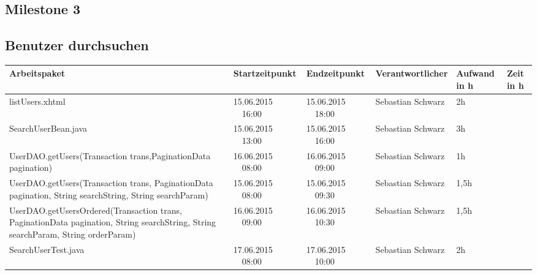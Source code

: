 \begin{landscape}
	\section{Milestone 3}	
	
	\subsection{Benutzer durchsuchen}
	\begin{tabular}{|p{10.3cm}|p{3.2cm}|p{3.2cm}|p{3.5cm}|p{1.7cm}|p{1.5cm}|}
		\hline  \textbf{Arbeitspaket} & \textbf{Startzeitpunkt} & \textbf{Endzeitpunkt} & \textbf{Verantwortlicher}  & \textbf{Aufwand in h} & \textbf{Zeit in h}\\ 
		\hline   listUsers.xhtml                                               & 15.06.2015 \ \ 16:00       & 15.06.2015 \ \ 18:00      & Sebastian Schwarz  & 2h       &\\  
		\hline   SearchUserBean.java                                           & 15.06.2015 \ \ 13:00       & 15.06.2015 \ \ 16:00        & Sebastian Schwarz & 3h                 &\\  
		\hline   UserDAO.getUsers(Transaction trans,PaginationData pagination) & 16.06.2015 \ \ 08:00       & 16.06.2015 \ \ 09:00        & Sebastian Schwarz & 1h                 &\\  
		\hline   UserDAO.getUsers(Transaction trans, PaginationData pagination, String searchString, String searchParam) & 15.06.2015 \ \ 08:00       & 15.06.2015 \ \ 09:30       & Sebastian Schwarz  & 1,5h                 &\\  
		\hline   UserDAO.getUsersOrdered(Transaction trans, PaginationData pagination, String searchString, String searchParam, String orderParam)    & 16.06.2015 \ \ 09:00       & 16.06.2015 \ \ 10:30 & Sebastian Schwarz & 1,5h                 &\\  
		\hline SearchUserTest.java      &   17.06.2015 \ \ 08:00         &  17.06.2015 \ \ 10:00          & Sebastian Schwarz &        2h           &  \\
		\hline 
	\end{tabular} \ \\
	\ \\
	

\end{landscape}
